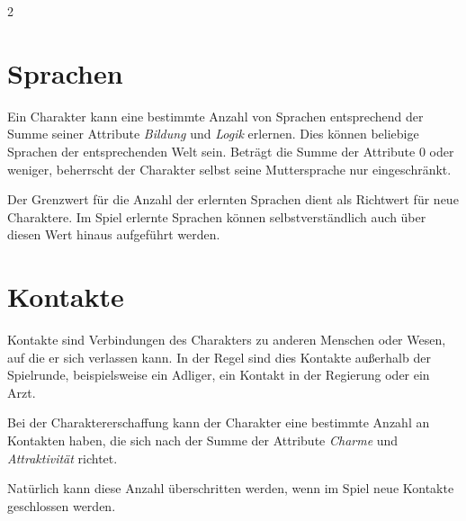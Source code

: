\begin{multicols}{2}
\section{Sprachen}

Ein Charakter kann eine bestimmte Anzahl von Sprachen entsprechend der Summe seiner Attribute \textit{Bildung} und \textit{Logik} erlernen. Dies können beliebige Sprachen der entsprechenden Welt sein. Beträgt die Summe der Attribute 0 oder weniger, beherrscht der Charakter selbst seine Muttersprache nur eingeschränkt.

Der Grenzwert für die Anzahl der erlernten Sprachen dient als Richtwert für neue Charaktere. Im Spiel erlernte Sprachen können selbstverständlich auch über diesen Wert hinaus aufgeführt werden.


\section{Kontakte}

Kontakte sind Verbindungen des Charakters zu anderen Menschen oder Wesen, auf die er sich verlassen kann. In der Regel sind dies Kontakte außerhalb der Spielrunde, beispielsweise ein Adliger, ein Kontakt in der Regierung oder ein Arzt.

Bei der Charaktererschaffung kann der Charakter eine bestimmte Anzahl an Kontakten haben, die sich nach der Summe der Attribute \textit{Charme} und \textit{Attraktivität} richtet.

Natürlich kann diese Anzahl überschritten werden, wenn im Spiel neue Kontakte geschlossen werden.
\end{multicols}

